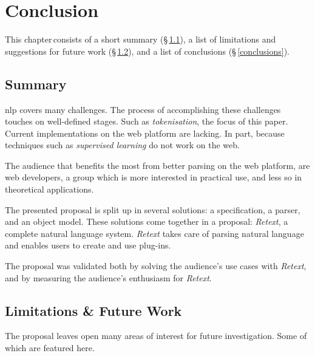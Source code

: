 \chapter{Conclusion}\label{conclusion}

This chapter\,consists of a short summary (§\,\ref{summary}), a list of
  limitations and suggestions for future work
  (§\,\ref{limitations-future-work}), and a list of conclusions
  (§\,\ref{conclusions}).

\section{Summary}\label{summary}

\gls{nlp} covers many challenges.
The process of accomplishing these challenges touches on well-defined stages.
Such as \emph{tokenisation}, the focus of this paper.
Current implementations on the web platform are lacking.
In part, because techniques such as \emph{supervised learning} do not work
  on the web.

The audience that benefits the most from better parsing on the web platform,
  are web developers, a group which is more interested in practical use, and
  less so in theoretical applications.

The presented proposal is split up in several solutions: a specification, a
  parser, and an object model.
These solutions come together in a proposal: \emph{Retext}, a complete natural
  language system.
\emph{Retext} takes care of parsing natural language and enables users to
  create and use plug-ins.

The proposal was validated both by solving the audience's use cases with
  \emph{Retext}, and by measuring the audience's enthusiasm for \emph{Retext}.

\section{Limitations \& Future Work}\label{limitations-future-work}

The proposal leaves open many areas of interest for future investigation.
Some of which are featured here.

